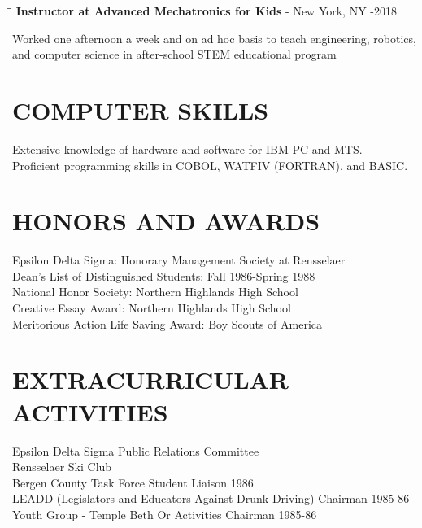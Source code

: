 \documentclass{res}
\begin{document}
\begin{resume}
\begin{tabbing}
   \hspace{2.3in}\= \hspace{2.6in}\= \kill %
   {\bf Instructor at Advanced Mechatronics for Kids} - New York, NY   \>  -2018
   \end{tabbing}\vspace{-20pt}      %
    Worked one afternoon a week and on ad hoc basis to teach engineering, robotics, and computer
	science in after-school STEM educational program          


\section{COMPUTER SKILLS}          
    Extensive knowledge of hardware and software for IBM PC and          
    MTS. \\         
    Proficient programming skills in COBOL, WATFIV (FORTRAN), and          
    BASIC.          
 
 
\section{HONORS AND AWARDS}          
    Epsilon Delta Sigma: Honorary Management Society at          
    Rensselaer    \\      
    Dean's List of Distinguished Students: Fall 1986-Spring 1988  \\        
    National Honor Society: Northern Highlands High School  \\        
    Creative Essay Award: Northern Highlands High School  \\        
    Meritorious Action Life Saving Award: Boy Scouts of America          
 
\section{EXTRACURRICULAR ACTIVITIES}          
    Epsilon Delta Sigma Public Relations Committee \\         
    Rensselaer Ski Club     \\     
    Bergen County Task Force Student Liaison 1986  \\        
    LEADD (Legislators and Educators Against Drunk Driving) Chairman
     1985-86  \\        
    Youth Group - Temple Beth Or Activities Chairman 1985-86          
 
\end{resume}
\end{document}
